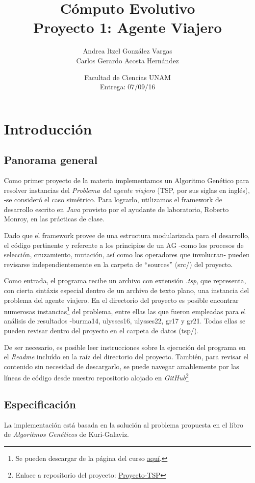\documentclass[12pt]{article}
\title{Cómputo Evolutivo \\ Proyecto 1: Agente Viajero}
\author{Andrea Itzel González Vargas \\
  Carlos Gerardo Acosta Hernández}
\date{Facultad de Ciencias UNAM \\ Entrega: 07/09/16}
\begin{document}
\maketitle
\section*{Introducción}
\subsection*{Panorama general}
Como primer proyecto de la materia implementamos un Algoritmo Genético
para resolver instancias del
\textit{Problema del agente viajero} (TSP, por sus siglas en inglés),
-se consideró el caso simétrico.
Para lograrlo, utilizamos el framework de desarrollo escrito en \textit{Java}
provisto por el ayudante de laboratorio, Roberto Monroy, en las prácticas de clase.\par
Dado que el framework provee de
una estructura modularizada para el desarrollo, el código pertinente y
referente a los principios de un AG -como los procesos de selección,
cruzamiento, mutación, así como los operadores que involucran- pueden
revisarse independientemente en la carpeta de ``sources'' (src/) del proyecto.\par
Como entrada, el programa recibe un archivo con extensión \textit{.tsp},
que representa, con cierta sintáxis especial dentro de un archivo de texto plano,
una instancia del problema del agente viajero.
En el directorio del proyecto
es posible encontrar numerosas instancias\footnote{Se pueden descargar de la página del curso \href{https://sites.google.com/site/unamfcienciascomputoevolutivo/assignments/assignment1/tsp.tar.gz}{aquí}.} del problema, entre ellas las que
fueron empleadas para el análisis de resultados -burma14, ulysses16, ulysses22, gr17 y gr21.
Todas ellas se pueden revisar dentro del proyecto en el carpeta de datos (tsp/).\par
De ser necesario, es posible leer instrucciones sobre la ejecución del programa
en el \textit{Readme} incluído en la raíz del directorio del proyecto.
También, para revisar el contenido sin necesidad de descargarlo,
se puede navegar amablemente por las líneas de código desde nuestro repositorio
alojado en \textit{GitHub}\footnote{Enlace a repositorio del proyecto: \href{https://github.com/Kihui/Proyecto-TSP}{Proyecto-TSP}}

\newpage
\subsection*{Especificación}
La implementación está basada en la solución al problema propuesta en el
libro de \textit{Algoritmos Genéticos} de Kuri-Galaviz.
\end{document}
